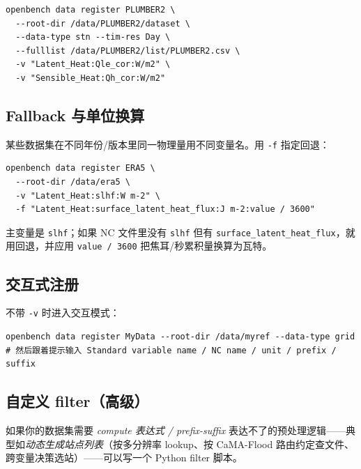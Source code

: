 \begin{exampleBox}[注册站点数据]
\begin{verbatim}
openbench data register PLUMBER2 \
  --root-dir /data/PLUMBER2/dataset \
  --data-type stn --tim-res Day \
  --fulllist /data/PLUMBER2/list/PLUMBER2.csv \
  -v "Latent_Heat:Qle_cor:W/m2" \
  -v "Sensible_Heat:Qh_cor:W/m2"
\end{verbatim}
\end{exampleBox}

\subsection{Fallback 与单位换算}

某些数据集在不同年份/版本里同一物理量用不同变量名。用 \texttt{-f} 指定回退：

\begin{exampleBox}[fallback + 单位换算]
\begin{verbatim}
openbench data register ERA5 \
  --root-dir /data/era5 \
  -v "Latent_Heat:slhf:W m-2" \
  -f "Latent_Heat:surface_latent_heat_flux:J m-2:value / 3600"
\end{verbatim}
\end{exampleBox}

主变量是 \texttt{slhf}；如果 NC 文件里没有 \texttt{slhf} 但有 \texttt{surface\_latent\_heat\_flux}，就用回退，并应用 \texttt{value / 3600} 把焦耳/秒累积量换算为瓦特。

\subsection{交互式注册}

不带 \texttt{-v} 时进入交互模式：

\begin{verbatim}
openbench data register MyData --root-dir /data/myref --data-type grid
# 然后跟着提示输入 Standard variable name / NC name / unit / prefix / suffix
\end{verbatim}

\subsection{自定义 filter（高级）}

如果你的数据集需要 \emph{compute 表达式 / prefix-suffix} 表达不了的预处理逻辑——典型如\emph{动态生成站点列表}（按多分辨率 lookup、按 CaMA-Flood 路由约定查文件、跨变量决策选站）——可以写一个 Python filter 脚本。

